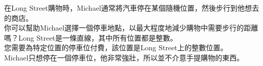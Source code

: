 在Long Street購物時，Michael通常將汽車停在某個隨機位置，然後步行到他想去的商店。\\
你可以幫助Michael選擇一個停車地點，以最大程度地減少購物中需要步行的距離嗎？Long Street是一條直線，其中所有位置都是整數。\\
您需要為特定位置的停車位付費，該位置是Long Street上的整數位置。\\
Michael只想停在一個停車位，他非常強壯，所以並不介意手提購物的東西。\\
